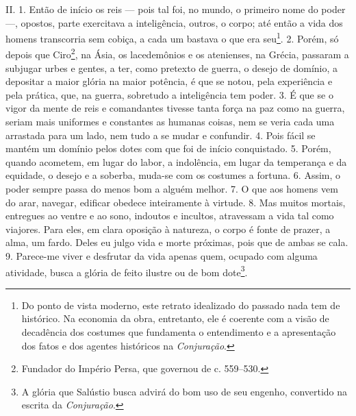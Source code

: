 II. 1. Então de início os reis --- pois tal foi, no mundo, o primeiro
nome do poder ---, opostos, parte exercitava a inteligência, outros, o corpo;
até então a vida dos homens transcorria sem cobiça, a cada um bastava o que era
seu\footnote{Do ponto de vista moderno, este retrato idealizado do passado nada
tem de histórico. Na economia da obra, entretanto, ele é coerente com a visão
de decadência dos costumes que fundamenta o entendimento e a apresentação dos
fatos e dos agentes históricos na  \emph{Conjuração}.}. 2. Porém, só depois que
Ciro\footnote{Fundador do Império Persa, que governou de c. 559--530.}, na Ásia, os lacedemônios e os atenienses, na Grécia,
passaram a subjugar urbes e gentes, a ter, como pretexto de guerra, o desejo de
domínio, a depositar a maior glória na maior potência, é que se notou, pela
experiência e pela prática, que, na guerra, sobretudo a inteligência tem poder.
3. É que se o vigor da mente de reis e comandantes tivesse tanta força na paz
como na guerra, seriam mais uniformes e constantes as humanas coisas, nem se
veria cada uma arrastada para um lado, nem tudo a se mudar e confundir. 4. Pois
fácil se mantém um domínio pelos dotes com que foi de início conquistado. 5.
Porém, quando acometem, em lugar do labor, a indolência, em lugar da temperança
e da equidade, o desejo e a soberba, muda-se com os costumes a fortuna. 6.
Assim, o poder sempre passa do menos bom a alguém melhor. 7. O que aos homens
vem do arar, navegar, edificar obedece inteiramente à virtude. 8. Mas muitos
mortais, entregues ao ventre e ao sono, indoutos e incultos, atravessam a vida
tal como viajores. Para eles, em clara oposição à natureza, o corpo é fonte de
prazer, a alma, um fardo. Deles eu julgo vida e morte próximas, pois que de
ambas se cala. 9. Parece-me viver e desfrutar da vida apenas quem, ocupado com
alguma atividade, busca a glória de feito ilustre ou de bom dote\footnote{A
glória que Salústio busca advirá do bom uso de seu engenho, convertido na
escrita da \emph{Conjuração}.}.

